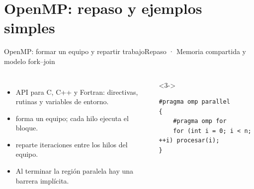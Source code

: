 \documentclass[aspectratio=169,10pt]{beamer}
\newcommand{\code}[1]{\texttt{\detokenize{#1}}}
\begin{document}
\section{OpenMP: repaso y ejemplos simples}
\begin{frame}[fragile]{OpenMP: formar un equipo y repartir trabajo}{Repaso · Memoria compartida y modelo fork--join}
\begin{columns}[T,onlytextwidth]
\begin{itemize}[<+->]\setlength\itemsep{4pt}
  \item API para C, C++ y Fortran: directivas, rutinas y variables de entorno.
  \item \code{parallel} forma un equipo; cada hilo ejecuta el bloque.
  \item \code{for} reparte iteraciones entre los hilos del equipo.
  \item Al terminar la región paralela hay una barrera implícita.
\end{itemize}
\begin{uncoverenv}<3->
\begin{lstlisting}[style=compact]
#pragma omp parallel
{
    #pragma omp for
    for (int i = 0; i < n; ++i) procesar(i);
}
\end{lstlisting}
\end{uncoverenv}
\centering
{}
\end{columns}
\end{frame}
\end{document}
